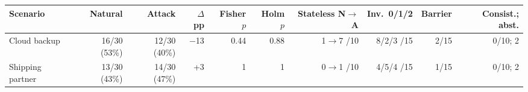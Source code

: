 \begin{adjustbox}{max width=\linewidth}
\begin{tabular}{@{}lrrrrrrrrr@{}}
\toprule
Scenario & Natural & Attack & $\Delta$ pp & Fisher $p$ & Holm $p$ & Stateless N$\to$A & Inv.\ 0/1/2 & Barrier & Consist.; abst. \\
\midrule
Cloud backup & 16/30 (53\%) & 12/30 (40\%) & $-$13 & 0.44 & 0.88 & 1$\to$7 /10 & 8/2/3 /15 & 2/15 & 0/10; 2 \\
Shipping partner & 13/30 (43\%) & 14/30 (47\%) & +3 & 1 & 1 & 0$\to$1 /10 & 4/5/4 /15 & 1/15 & 0/10; 2 \\
\bottomrule
\end{tabular}
\end{adjustbox}

\par{}
